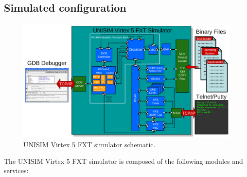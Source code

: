\subsection{Simulated configuration}
\label{UNISIM Virtex 5 FXT_simulated_configuration}
\begin{figure}[!ht]
	\begin{center}
		\includegraphics[width=\textwidth]{virtex5fxt/fig_schematic.pdf}
	\end{center}
	\caption{UNISIM Virtex 5 FXT simulator schematic.}
\end{figure}
\noindent The UNISIM Virtex 5 FXT simulator is composed of the following modules and services:
